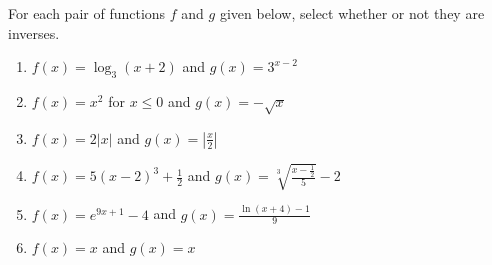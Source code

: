 \documentclass{ximera}
\author{Kenneth Berglund}
\begin{document}
\begin{exercise}
For each pair of functions $f$ and $g$ given below, select whether or not they are inverses.
\begin{enumerate}
\item $f(x) = \log_3(x + 2)$ and $g(x) = 3^{x - 2}$
\begin{multipleChoice}  
\end{multipleChoice} 

\item $f(x) = x^2$ for $x \le 0$ and $g(x) = -\sqrt{x}$ 
\begin{multipleChoice}  
\end{multipleChoice} 

\item $f(x) = 2|x|$ and $g(x) = \left|\frac{x}{2}\right|$ 
\begin{multipleChoice}  
\end{multipleChoice} 

\item $f(x) = 5(x - 2)^3 +\frac{1}{2}$ and $g(x) = \sqrt[3]{\frac{x - \frac{1}{2}}{5}} - 2$ 
\begin{multipleChoice}  
\end{multipleChoice} 

\item $f(x) = e^{9x+1} - 4$ and $g(x) = \frac{\ln(x + 4) - 1}{9}$ 
\begin{multipleChoice}  
\end{multipleChoice} 

\item $f(x) = x$ and $g(x) = x$
\begin{multipleChoice}
\end{multipleChoice}

\end{enumerate}
\end{exercise}
\end{document}
